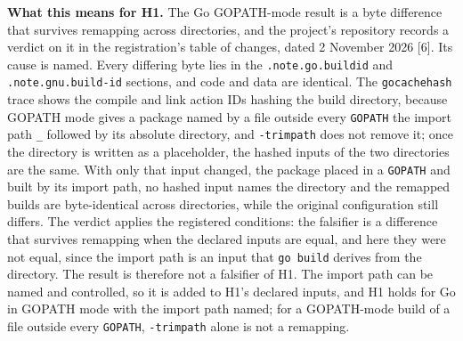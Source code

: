 \documentclass[10pt,letterpaper]{article}
\begin{document}
\textbf{What this means for H1.} The Go GOPATH-mode result is a byte
difference that survives remapping across directories, and the project's
repository records a verdict on it in the registration's table of
changes, dated 2 November 2026 {[}6{]}. Its cause is named. Every
differing byte lies in the \texttt{.\allowbreak{}note.\allowbreak{}go.\allowbreak{}buildid} and
\texttt{.\allowbreak{}note.\allowbreak{}gnu.\allowbreak{}build-\allowbreak{}id} sections, and code and data are identical.
The \texttt{gocachehash} trace shows the compile and link action IDs
hashing the build directory, because GOPATH mode gives a package named
by a file outside every \texttt{GOPATH} the import path \texttt{\_}
followed by its absolute directory, and \texttt{-trimpath} does not
remove it; once the directory is written as a placeholder, the hashed
inputs of the two directories are the same. With only that input
changed, the package placed in a \texttt{GOPATH} and built by its import
path, no hashed input names the directory and the remapped builds are
byte-identical across directories, while the original configuration
still differs. The verdict applies the registered conditions: the
falsifier is a difference that survives remapping when the declared
inputs are equal, and here they were not equal, since the import path is
an input that \texttt{go\ build} derives from the directory. The result
is therefore not a falsifier of H1. The import path can be named and
controlled, so it is added to H1's declared inputs, and H1 holds for Go
in GOPATH mode with the import path named; for a GOPATH-mode build of a
file outside every \texttt{GOPATH}, \texttt{-trimpath} alone is not a
remapping.
\end{document}
